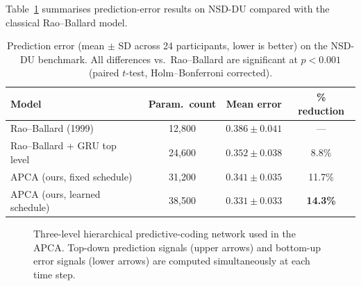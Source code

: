 \documentclass[12pt, a4paper, oneside]{report}
\theoremstyle{definition}
\theoremstyle{remark}
\begin{document}
Table~\ref{tab:nsd-results} summarises prediction-error results on NSD-DU compared with
the classical Rao--Ballard model.

\begin{table}[H]
\centering
\caption{Prediction error (mean $\pm$ SD across 24 participants, lower is better) on the
  NSD-DU benchmark.  All differences vs.\ Rao--Ballard are significant at $p < 0.001$
  (paired $t$-test, Holm--Bonferroni corrected).}
\label{tab:nsd-results}
\begin{tabularx}{0.9\linewidth}{@{}>{\raggedright\arraybackslash}Xccc@{}}
\toprule
\textbf{Model} & \textbf{Param.\ count} & \textbf{Mean error} & \textbf{\% reduction} \\
\midrule
Rao--Ballard (1999)           & 12,800  & $0.386 \pm 0.041$ & ---      \\
Rao--Ballard + GRU top level  & 24,600  & $0.352 \pm 0.038$ & 8.8\%   \\
APCA (ours, fixed schedule)   & 31,200  & $0.341 \pm 0.035$ & 11.7\%  \\
APCA (ours, learned schedule) & 38,500  & $\mathbf{0.331 \pm 0.033}$ & \textbf{14.3\%} \\
\bottomrule
\end{tabularx}
\end{table}

\begin{figure}[H]
\centering
{}
\caption{Three-level hierarchical predictive-coding network used in the APCA.  Top-down
  prediction signals (upper arrows) and bottom-up error signals (lower arrows) are
  computed simultaneously at each time step.}
\label{fig:pred-coding}
\end{figure}
\end{document}
